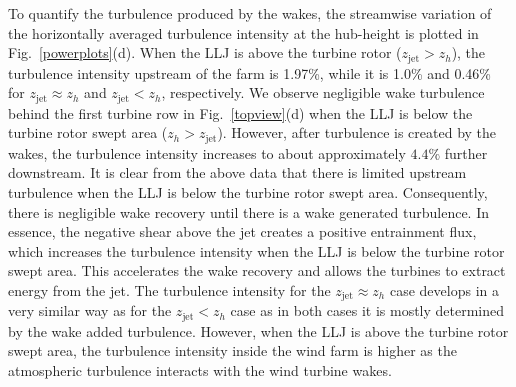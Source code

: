 \documentclass[%
 aip,
 amsmath,amssymb,
reprint,
twocolumn,%
author-numerical,%
]{revtex4-1}
\begin{document}
{{To quantify the turbulence produced by the wakes, the streamwise variation of the horizontally averaged turbulence intensity at the hub-height is plotted in Fig.\ \ref{powerplots}(d). When the LLJ is above the turbine rotor ($z_\text{jet} > z_h$), the turbulence intensity upstream of the farm is 1.97\%, while it is 1.0\% and 0.46\% for $z_\text{jet} \approx z_h$ and $z_\text{jet} < z_h$, respectively. We observe negligible wake turbulence behind the first turbine row in Fig.\ \ref{topview}(d) when the LLJ is below the turbine rotor swept area ($z_h > {z_\text{jet}}$). However, after turbulence is created by the wakes, the turbulence intensity increases to about approximately $4.4\%$ further downstream. It is clear from the above data that there is limited upstream turbulence when the LLJ is below the turbine rotor swept area. Consequently, there is negligible wake recovery until there is a wake generated turbulence. In essence, the negative shear above the jet creates a positive entrainment flux, which increases the turbulence intensity when the LLJ is below the turbine rotor swept area. This accelerates the wake recovery and allows the turbines to extract energy from the jet. The turbulence intensity for the $z_\text{jet} \approx z_h$ case develops in a very similar way as for the ${z_\text{jet}} < z_h$ case as in both cases it is mostly determined by the wake added turbulence. However, when the LLJ is above the turbine rotor swept area, the turbulence intensity inside the wind farm is higher as the atmospheric turbulence interacts with the wind turbine wakes.

}}
\end{document}
